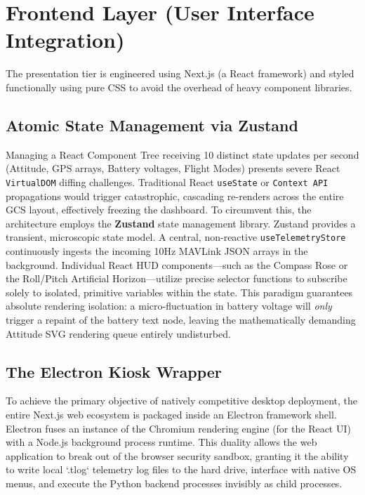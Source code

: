 \section{Frontend Layer (User Interface Integration)}
The presentation tier is engineered using Next.js (a React framework) and styled functionally using pure CSS to avoid the overhead of heavy component libraries.

\subsection{Atomic State Management via Zustand}
Managing a React Component Tree receiving 10 distinct state updates per second (Attitude, GPS arrays, Battery voltages, Flight Modes) presents severe React \texttt{VirtualDOM} diffing challenges. Traditional React \texttt{useState} or \texttt{Context API} propagations would trigger catastrophic, cascading re-renders across the entire GCS layout, effectively freezing the dashboard.
To circumvent this, the architecture employs the \textbf{Zustand} state management library. Zustand provides a transient, microscopic state model. A central, non-reactive \texttt{useTelemetryStore} continuously ingests the incoming 10Hz MAVLink JSON arrays in the background. Individual React HUD components—such as the Compass Rose or the Roll/Pitch Artificial Horizon—utilize precise selector functions to subscribe solely to isolated, primitive variables within the state. This paradigm guarantees absolute rendering isolation: a micro-fluctuation in battery voltage will \textit{only} trigger a repaint of the battery text node, leaving the mathematically demanding Attitude SVG rendering queue entirely undisturbed.

\subsection{The Electron Kiosk Wrapper}
To achieve the primary objective of natively competitive desktop deployment, the entire Next.js web ecosystem is packaged inside an Electron framework shell. Electron fuses an instance of the Chromium rendering engine (for the React UI) with a Node.js background process runtime. This duality allows the web application to break out of the browser security sandbox, granting it the ability to write local `.tlog` telemetry log files to the hard drive, interface with native OS menus, and execute the Python backend processes invisibly as child processes.
